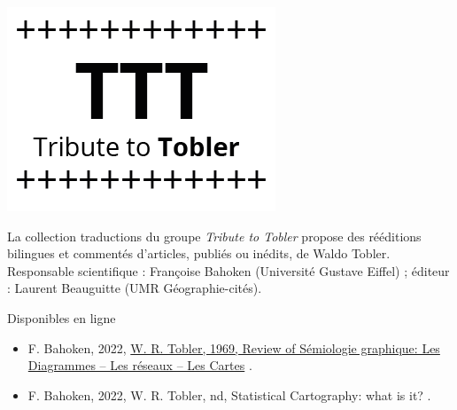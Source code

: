 \rfoot{}

\begin{center}
\includegraphics[scale=1]{logo.png}
\end{center}

\bigskip

\noindent La collection \og \color{notettt}traductions \color{black} \fg{} du groupe \emph{Tribute to Tobler} propose des rééditions bilingues et commentés d'articles, publiés ou inédits, de Waldo Tobler. Responsable scientifique : Françoise Bahoken (Université Gustave Eiffel) ; éditeur : Laurent Beauguitte (UMR Géographie-cités).

\bigskip

\noindent Disponibles en ligne
\begin{itemize}
\item F. Bahoken, 2022, \og \href{https://hal.archives-ouvertes.fr/hal-03583854/document}{W. R. Tobler, 1969, Review of Sémiologie graphique: Les Diagrammes – Les réseaux – Les Cartes} \fg.
\item F. Bahoken, 2022, \og W. R. Tobler, nd, Statistical Cartography: what is it? \fg.
\end{itemize}
